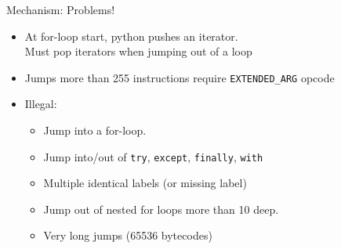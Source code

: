 \documentclass{beamer}
\begin{document}
%

\begin{frame}[fragile]{Mechanism: Problems!}

\begin{itemize}
\item At for-loop start, python pushes an iterator. \\ Must pop iterators when jumping out of a loop
\item Jumps more than 255 instructions require \texttt{EXTENDED\_ARG} opcode
\item Illegal:
\begin{itemize}
\item Jump into a for-loop.
\item Jump into/out of \verb!try!, \verb!except!, \verb!finally!, \verb!with!
\item Multiple identical labels (or missing label)
\item Jump out of nested for loops more than 10 deep.
\item Very long jumps (65536 bytecodes)
\end{itemize}
\end{itemize}
\end{frame}
\end{document}
